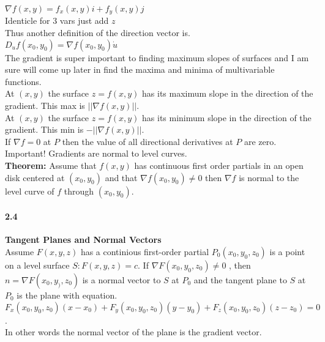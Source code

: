 \documentclass[14pt]{extreport}
\begin{document}
$\nabla f(x,y) = f_x(x, y)i + f_y(x,y)j$ \\

Identicle for 3 vars just add $z$\\

Thus another definition of the direction vector is.\\
$D_u f(x_0,y_0) = \nabla f(x_0,y_0) \dot u$\\

The gradient is super important to finding maximum slopes of surfaces and I am sure will come up later in find the maxima and minima of multivariable functions.\\

At $(x, y)$ the surface $z=f(x,y)$ has its maximum slope in the direction of the gradient. This max is $||\nabla f(x,y)||$.\\


At $(x, y)$ the surface $z=f(x,y)$ has its minimum slope in the direction of the gradient. This min is $-||\nabla f(x,y)||$.\\

If $\nabla f = 0$ at $P$ then the value of all directional derivatives at $P$ are zero.\\


Important! Gradients are normal to level curves.\\

\textbf{Theorem:} Assume that $f(x,y)$ has continuous first order partials in an open disk centered at $(x_0, y_0)$ and that $\nabla f(x_0, y_0) \ne 0$ then $\nabla f$ is normal to the level curve of $f$ through $(x_0, y_0)$.\\

\paragraph{2.4}\textbf{Tangent Planes and Normal Vectors}\\

Assume $F(x,y,z)$ has a continious first-order partial $P_0(x_0,y_0,z_0)$ is a point on a level surface $S: F(x,y,z) = c$. If $\nabla F(x_0,y_0,z_0) \ne 0$ , then $n=\nabla F(x_0,y_),z_0)$ is a normal vector to $S$ at $P_0$ and the tangent plane to $S$ at $P_0$ is the plane with equation.\\

$$F_x(x_0,y_0,z_0)(x - x_0) + F_y(x_0,y_0,z_0)(y-y_0) + F_z(x_0,y_0,z_0)(z-z_0)=0$$.\\ 

In other words the normal vector of the plane is the gradient vector.\\
\end{document}
